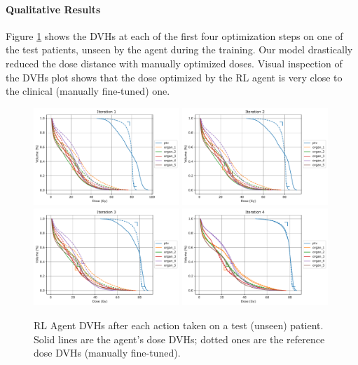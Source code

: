 \paragraph{Qualitative Results}
Figure \ref{fig:steps} shows the DVHs at each of the first four optimization steps on one of the test patients, unseen by the agent during the training.
Our model drastically reduced the dose distance with manually optimized doses.
Visual inspection of the DVHs plot shows that the dose optimized by the RL agent is very close to the clinical (manually fine-tuned) one.

\begin{figure}
	\centering
	\includegraphics[width=0.49\textwidth]{AIME/distance-test-w1.pdf}
	\includegraphics[width=0.49\textwidth]{AIME/distance-test-w2.pdf}
	\includegraphics[width=0.49\textwidth]{AIME/distance-test-w3.pdf}
	\includegraphics[width=0.49\textwidth]{AIME/distance-test-w4.pdf}
	\caption{
		RL Agent DVHs after each action taken on a test (unseen) patient.
		Solid lines are the agent's dose DVHs; dotted ones are the reference dose DVHs (manually fine-tuned).
	}
	\label{fig:steps}
\end{figure}


